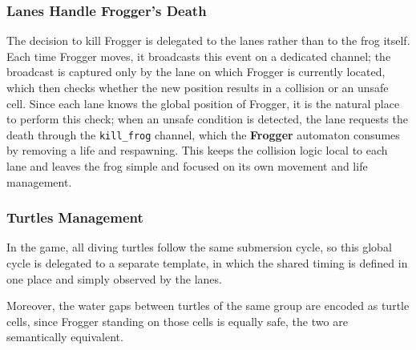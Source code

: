\documentclass[a4paper]{article}
\begin{document}
\subsubsection*{Lanes Handle Frogger's Death}
The decision to kill Frogger is delegated to the lanes rather than to the frog
itself. Each time Frogger moves, it broadcasts this event on a dedicated
channel; the broadcast is captured only by the lane on which Frogger is
currently located, which then checks whether the new position results in a
collision or an unsafe cell. Since each lane knows the global position of
Frogger, it is the natural place to perform this check; when an unsafe
condition is detected, the lane requests the death through the
\texttt{kill\_frog} channel, which the \textbf{Frogger} automaton consumes by
removing a life and respawning. This keeps the collision logic local to each
lane and leaves the frog simple and focused on its own movement and life
management.

\subsubsection*{Turtles Management}
In the game, all diving turtles follow the same submersion cycle, so this
global cycle is delegated to a separate template, in which the shared timing
is defined in one place and simply observed by the lanes.

Moreover, the water gaps between turtles of the same group are encoded as turtle cells, since Frogger 
standing on those cells is equally safe, the two are semantically equivalent.
\end{document}
